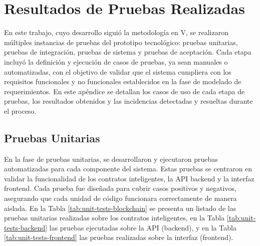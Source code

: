 \chapter{Resultados de Pruebas Realizadas}
\label{cp:tests-execution-results}

En este trabajo, cuyo desarrollo siguió la metodología en V, se realizaron múltiples instancias de pruebas del prototipo tecnológico: pruebas unitarias, pruebas de integración, pruebas de sistema y pruebas de aceptación. Cada etapa incluyó la definición y ejecución de casos de pruebas, ya sean manuales o automatizadas, con el objetivo de validar que el sistema cumpliera con los requisitos funcionales y no funcionales establecidos en la fase de modelado de requerimientos. En este apéndice se detallan los casos de uso de cada etapa de pruebas, los resultados obtenidos y las incidencias detectadas y resueltas durante el proceso.

\section{Pruebas Unitarias}

En la fase de pruebas unitarias, se desarrollaron y ejecutaron pruebas automatizadas para cada componente del sistema. Estas pruebas se centraron en validar la funcionalidad de los contratos inteligentes, la API backend y la interfaz frontend. Cada prueba fue diseñada para cubrir casos positivos y negativos, asegurando que cada unidad de código funcionara correctamente de manera aislada. En la Tabla \ref{tab:unit-tests-blockchain} se presenta un listado de las pruebas unitarias realizadas sobre los contratos inteligentes, en la Tabla \ref{tab:unit-tests-backend} las pruebas ejecutadas sobre la API (backend), y en la Tabla \ref{tab:unit-tests-frontend} las pruebas realizadas sobre la interfaz (frontend).


